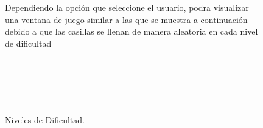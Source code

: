 \documentclass[12pt,oneside]{book}
\begin{document}
		\begin{figure}
Dependiendo la opción que seleccione el usuario, podra visualizar una ventana de juego similar a las que se muestra a continuación debido a que las casillas se llenan de manera aleatoria en cada nivel de dificultad
		 \ \\ \ \\ \
			\centering
				\caption{Niveles de Dificultad.}
		 \ \\ \

\end{figure}
\end{document}

